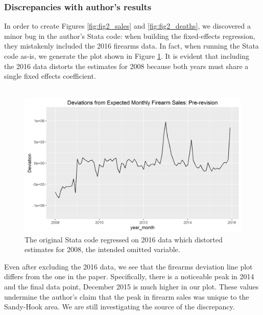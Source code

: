 \documentclass[12pt]{article}%
\begin{document}
\subsubsection*{Discrepancies with author's results}
In order to create Figures \ref{fig:fig2_sales} and \ref{fig:fig2_deaths}, we discovered a minor bug in the author's Stata code: when building the fixed-effects regression, they mistakenly included the 2016 firearms data. In fact, when running the Stata code as-is, we generate the plot shown in Figure \ref{fig:fig2_pre_revision}. It is evident that including the 2016 data distorts the estimates for 2008 because both years must share a single fixed effects coefficient. \\ \\
\begin{figure}[hbt]
	\centering
	\includegraphics[width=0.75\linewidth]{figures/fig2_pre_revision.png}
	\caption{The original Stata code regressed on 2016 data which distorted estimates for 2008, the intended omitted variable.}
	\label{fig:fig2_pre_revision}
\end{figure}
Even after excluding the 2016 data, we see that the firearms deviation line plot differs from the one in the paper. Specifically, there is a noticeable peak in 2014 and the final data point, December 2015 is much higher in our plot. These values undermine the author's claim that the peak in firearm sales was unique to the Sandy-Hook area. We are still investigating the source of the discrepancy. 
\end{document}
